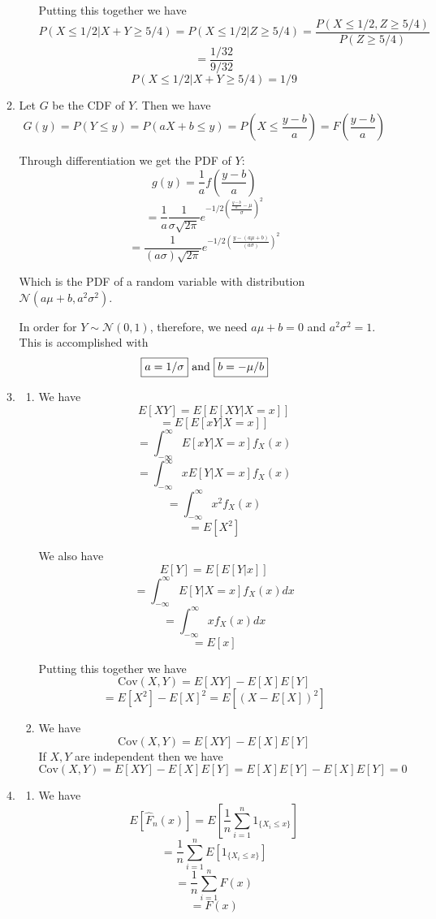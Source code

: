 \documentclass[submit]{harvardml}
\begin{document}
\begin{enumerate}
\begin{enumerate}
\begin{enumerate}
      Putting this together we have
      $$P(X\leq 1/2 | X + Y \geq 5/4) = P(X\leq 1/2 | Z\geq 5/4)
      = \frac{P(X\leq 1/2, Z \geq 5/4)}{P(Z \geq 5/4)}$$
      $$=\frac{1/32}{9/32}$$
      $$\boxed{P(X\leq 1/2 | X + Y \geq 5/4)=1/9}$$
    \end{enumerate}

    \item
    Let $G$ be the CDF of $Y$. Then we have 
    $$G(y) = P(Y\leq y) = P(aX+b \leq y) = P(X\leq \frac{y-b}{a}) = F(\frac{y-b}{a})$$

    Through differentiation we get the PDF of $Y$:
    $$g(y) = \frac{1}{a} f(\frac{y-b}{a})$$
    $$=\frac{1}{a}\frac{1}{\sigma\sqrt{2\pi}} e^{-1/2 \left( \frac{\frac{y-b}{a} -\mu}{\sigma} \right) ^2}$$
    $$=\frac{1}{(a\sigma)\sqrt{2\pi}} e^{-1/2 \left( \frac{y-(a\mu+b)}{(a\sigma)} \right) ^2}$$

    Which is the PDF of a random variable with distribution $\mathcal{N}(a\mu+b, a^2\sigma^2)$.

    In order for $Y\sim \mathcal{N}(0,1)$, therefore, we need $a\mu+b=0$ and $a^2\sigma^2=1$. This 
    is accomplished with 
    $$\boxed{a=1/\sigma} \textnormal{ and }\boxed{b=-\mu/b}$$
  
    \item
    \begin{enumerate}
      \item 
      We have 
      $$E[XY] = E[E[XY|X=x]]$$
      $$=E[E[xY|X=x]]$$
      $$=\int_{-\infty}^\infty E[xY|X=x] f_X (x)$$
      $$=\int_{-\infty}^\infty x E[Y|X=x] f_X (x)$$
      $$=\int_{-\infty}^\infty x^2 f_X (x)$$
      $$=E[X^2]$$

      We also have 
      $$E[Y]=E[E[Y|x]]$$
      $$=\int_{-\infty}^\infty E[Y|X=x] f_X(x) dx$$
      $$=\int_{-\infty}^\infty x f_X(x) dx$$
      $$=E[x]$$

      Putting this together we have
      $$\mathrm{Cov}(X,Y) = E[XY] - E[X]E[Y]$$
      $$= E[X^2] - E[X]^2 = E[(X-E[X])^2]$$

      \item
      We have 
      $$\mathrm{Cov}(X,Y) = E[XY] - E[X]E[Y]$$
      If $X,Y$ are independent then we have
      $$\mathrm{Cov}(X,Y) = E[XY] - E[X]E[Y] = E[X]E[Y] - E[X]E[Y] = 0$$
    \end{enumerate}

    \item
    \begin{enumerate}
      \item 
      We have 
      $$E[\hat{F}_n(x)] = E\left[\frac{1}{n} \sum_{i=1}^n 1_{\{X_i\leq x\}}\right]$$
      $$= \frac{1}{n} \sum_{i=1}^n E\left[ 1_{\{X_i\leq x\}}\right]$$
      $$= \frac{1}{n} \sum_{i=1}^n F(x)$$
      $$= F(x)$$


\end{enumerate}
\end{enumerate}
\end{enumerate}
\end{document}
